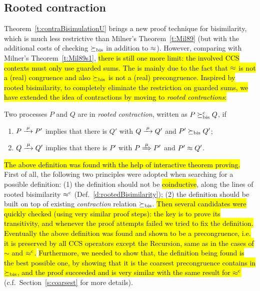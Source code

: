 \subsection{Rooted contraction}
\label{ss:new}

Theorem~\ref{t:contraBisimulationU} brings a new proof technique for
bisimilarity, which is much less restrictive than Milner's
Theorem~\ref{t:Mil89} (but with the additional costs of checking $\mathrel{\succeq_{\rm{bis}}}$
in addition to $\approx$).
However, comparing with Milner's Theorem~\ref{t:Mil89s1}, \hl{there is
still one more limit: the involved CCS contexts must only
use guarded sums. The is mainly due to the fact that $\approx$ is not a
 (real) congruence and also $\mathrel{\succeq_{\rm{bis}}}$ is not a (real) precongruence.
Inspired by rooted bisimilarity, to completely eliminate the restriction
on guarded sums, we have extended the idea of contractions by moving
to \emph{rooted contractions}:}

\begin{definition}
\label{d:rcontra}
Two processes $P$ and $Q$ are in \emph{rooted contraction}, written as
 $P\mathrel{\succeq^{\rm{c}}_{\rm{bis}}} Q$, if
\begin{enumerate}
\item $P \arr\mu P'$ implies that there is $Q'$ with $Q \arr \mu Q'$
 and $P'\mathrel{\succeq_{\rm{bis}}} Q'$;
\item $Q \arr\mu Q'$   implies that there is $P'$ with $P \Arr \mu
 P'$ and $P' \approx Q'$\enspace.
\end{enumerate}
\end{definition}

\hl{The above definition was found with the help of interactive theorem proving.}
First of all, the following two principles were adopted when searching
for a possible definition: (1) the definition should not be \hl{coinductive},
along the lines of rooted bisimilarity $\mathrel{\approx^{\rm{c}}}$ (Def.~\ref{d:rootedBisimilarity});
(2) the definition should be built on top of existing \emph{contraction}
relation $\mathrel{\succeq_{\rm{bis}}}$.
\hl{Then several candidates were quickly checked (using very similar
  proof steps): the key is to prove its transitivity, and whenever the
  proof attempts failed we tried to fix the definition. Eventually the
  above definition was found and shown to be a precongruence, i.e. it
  is preserved by all CCS operators except the Recursion, same as in
  the cases of $\sim$ and $\mathrel{\approx^{\rm{c}}}$.}
\hl{Furthermore, we needed to show that, the definition being found is the
best possible one, by showing that it is the coarsest precongruence
contains in $\mathrel{\succeq_{\rm{bis}}}$, and the proof succeeded and is very similar
with the same result for $\mathrel{\approx^{\rm{c}}}$} (c.f.~Section~\ref{s:coarsest} for
more details).

